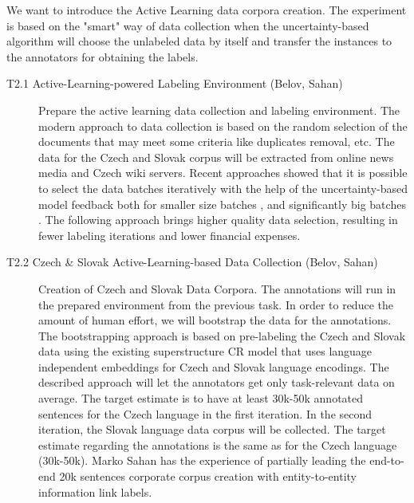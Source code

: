 We want to introduce the Active Learning data corpora creation. The experiment is based on the "smart" way of data collection when the uncertainty-based algorithm will choose the unlabeled data by itself and transfer the instances to the annotators for obtaining the labels. 

\begin{description}
	\item [T2.1 Active-Learning-powered Labeling Environment (Belov, Sahan)] Prepare the active learning data collection and labeling environment.
	The modern approach to data collection is based on the random selection of the documents that may meet some criteria like duplicates removal, etc. The data for the Czech and Slovak corpus will be extracted from online news media and Czech wiki servers. Recent approaches showed that it is possible to select the data batches iteratively with the help of the uncertainty-based model feedback both for smaller size batches \cite{gal2017deep, lowell2018practical}, and significantly big batches \cite{citovsky2021batch}. The following approach brings higher quality data selection, resulting in fewer labeling iterations and lower financial expenses.

	\item [T2.2 Czech \& Slovak Active-Learning-based Data Collection (Belov, Sahan)] Creation of Czech and Slovak Data Corpora. The annotations will run in the prepared environment from the previous task. In order to reduce the amount of human effort, we will bootstrap the data for the annotations. The bootstrapping approach is based on pre-labeling the Czech and Slovak data using the existing superstructure CR model that uses language independent embeddings for Czech and Slovak language encodings. The described approach will let the annotators get only task-relevant data on average.
	The target estimate is to have at least 30k-50k annotated sentences for the Czech language in the first iteration. In the second iteration, the Slovak language data corpus will be collected. The target estimate regarding the annotations is the same as for the Czech language (30k-50k). Marko Sahan has the experience of partially leading the end-to-end 20k sentences corporate corpus creation with entity-to-entity information link labels. 


\end{description}
